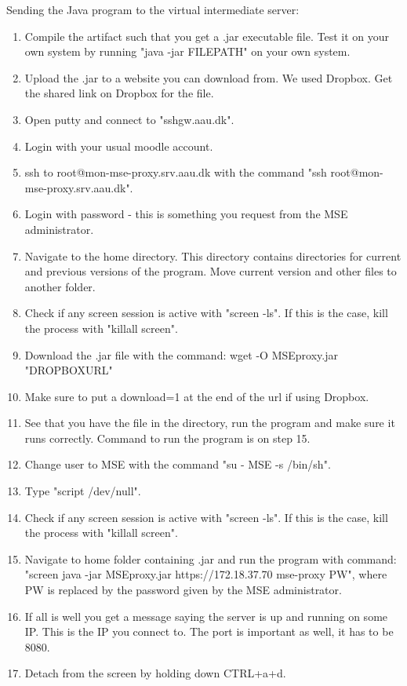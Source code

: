 Sending the Java program to the virtual intermediate server:
\begin{enumerate}
\item Compile the artifact such that you get a .jar executable file. Test it on your own system by running "java -jar FILEPATH" on your own system.
\item Upload the .jar to a website you can download from. We used Dropbox. Get the shared link on Dropbox for the file.
\item Open putty and connect to "sshgw.aau.dk".
\item Login with your usual moodle account.
\item ssh to root@mon-mse-proxy.srv.aau.dk with the command "ssh root@mon-mse-proxy.srv.aau.dk".
\item Login with password - this is something you request from the MSE administrator.
\item Navigate to the home directory. This directory contains directories for current and previous versions of the program. Move current version and other files to another folder. 
\item Check if any screen session is active with "screen -ls". If this is the case, kill the process with "killall screen".
\item Download the .jar file with the command: wget -O MSEproxy.jar "DROPBOXURL" 
\item Make sure to put a download=1 at the end of the url if using Dropbox.
\item See that you have the file in the directory, run the program and make sure it runs correctly. Command to run the program is on step 15.
\item Change user to MSE with the command "su - MSE -s /bin/sh".
\item Type "script /dev/null".
\item Check if any screen session is active with "screen -ls". If this is the case, kill the process with "killall screen".
\item Navigate to home folder containing .jar and run the program with command: "screen java -jar MSEproxy.jar https://172.18.37.70 mse-proxy PW", where PW is replaced by the password given by the MSE administrator.
\item If all is well you get a message saying the server is up and running on some IP. This is the IP you connect to. The port is important as well, it has to be 8080.
\item Detach from the screen by holding down CTRL+a+d.
\end{enumerate}

